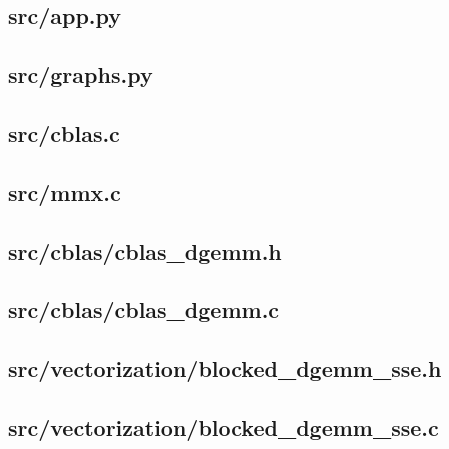 \subsection{src/app.py}
	
	\newpage

\subsection{src/graphs.py}
	
	\newpage

\subsection{src/cblas.c}
	
	\newpage

\subsection{src/mmx.c}

\newpage

\subsection{src/cblas/cblas\_dgemm.h}
	
	\newpage

\subsection{src/cblas/cblas\_dgemm.c}
	
	\newpage

\subsection{src/vectorization/blocked\_dgemm\_sse.h}
	
	\newpage

\subsection{src/vectorization/blocked\_dgemm\_sse.c}
	
	\newpage

